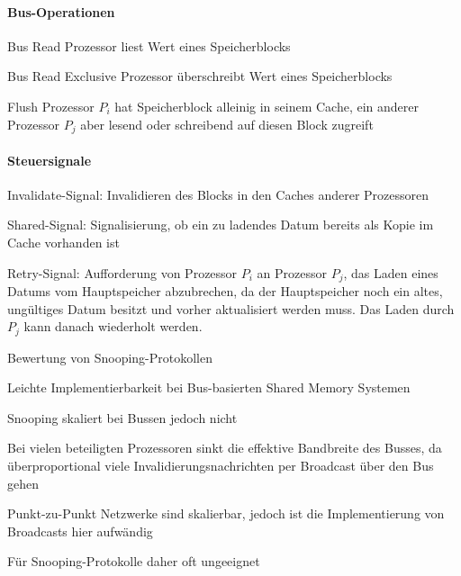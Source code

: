 \documentclass[10pt,landscape]{article}
\begin{document}
\begin{multicols}{3}
  \paragraph{Bus-Operationen}
  \begin{description*}
    \item[Bus Read] Prozessor liest Wert eines Speicherblocks
    \item[Bus Read Exclusive] Prozessor überschreibt Wert eines Speicherblocks
    \item[Flush] Prozessor $P_i$ hat Speicherblock alleinig in seinem Cache, ein anderer Prozessor $P_j$ aber lesend oder schreibend auf diesen Block zugreift
  \end{description*}
  
  \paragraph{Steuersignale}
  \begin{itemize*}
    \item Invalidate-Signal: Invalidieren des Blocks in den Caches anderer Prozessoren
    \item Shared-Signal: Signalisierung, ob ein zu ladendes Datum bereits als Kopie im Cache vorhanden ist
    \item Retry-Signal: Aufforderung von Prozessor $P_i$ an Prozessor $P_j$, das Laden eines Datums vom Hauptspeicher abzubrechen, da der Hauptspeicher noch ein altes, ungültiges Datum besitzt und vorher aktualisiert werden muss. Das Laden durch $P_j$ kann danach wiederholt werden.
  \end{itemize*}
  
  Bewertung von Snooping-Protokollen
  \begin{itemize*}
    \item Leichte Implementierbarkeit bei Bus-basierten Shared Memory Systemen
    \item Snooping skaliert bei Bussen jedoch nicht
    \item Bei vielen beteiligten Prozessoren sinkt die effektive Bandbreite des Busses, da überproportional viele Invalidierungsnachrichten per Broadcast über den Bus gehen
    \item Punkt-zu-Punkt Netzwerke sind skalierbar, jedoch ist die Implementierung von Broadcasts hier aufwändig
    \item Für Snooping-Protokolle daher oft ungeeignet
  \end{itemize*}
  

\end{multicols}
\end{document}
